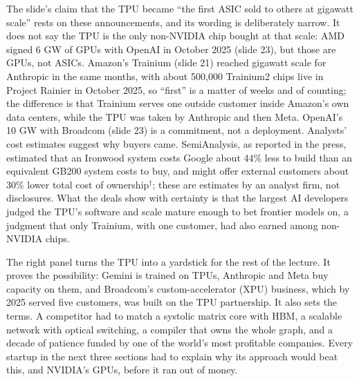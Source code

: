\documentclass[11pt,letterpaper]{article}
\begin{document}
The slide's claim that the TPU became ``the first ASIC sold to others at gigawatt scale'' rests on these announcements, and its wording is deliberately narrow. It does not say the TPU is the only non-NVIDIA chip bought at that scale: AMD signed 6 GW of GPUs with OpenAI in October 2025 (slide 23), but those are GPUs, not ASICs. Amazon's Trainium (slide 21) reached gigawatt scale for Anthropic in the same months, with about 500{,}000 Trainium2 chips live in Project Rainier in October 2025, so ``first'' is a matter of weeks and of counting; the difference is that Trainium serves one outside customer inside Amazon's own data centers, while the TPU was taken by Anthropic and then Meta. OpenAI's 10 GW with Broadcom (slide 23) is a commitment, not a deployment. Analysts' cost estimates suggest why buyers came. SemiAnalysis, as reported in the press, estimated that an Ironwood system costs Google about 44\% less to build than an equivalent GB200 system costs to buy, and might offer external customers about 30\% lower total cost of ownership$^\dagger$; these are estimates by an analyst firm, not disclosures. What the deals show with certainty is that the largest AI developers judged the TPU's software and scale mature enough to bet frontier models on, a judgment that only Trainium, with one customer, had also earned among non-NVIDIA chips.

The right panel turns the TPU into a yardstick for the rest of the lecture. It proves the possibility: Gemini is trained on TPUs, Anthropic and Meta buy capacity on them, and Broadcom's custom-accelerator (XPU) business, which by 2025 served five customers, was built on the TPU partnership. It also sets the terms. A competitor had to match a systolic matrix core with HBM, a scalable network with optical switching, a compiler that owns the whole graph, and a decade of patience funded by one of the world's most profitable companies. Every startup in the next three sections had to explain why its approach would beat this, and NVIDIA's GPUs, before it ran out of money.
\end{document}

